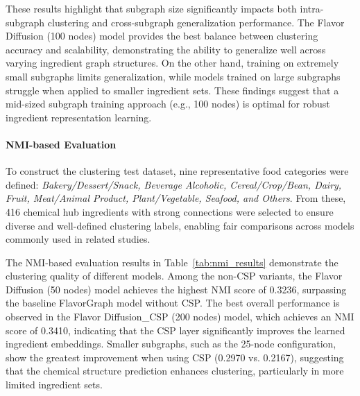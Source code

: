 \begin{table}[h!]
  \centering
  \caption{Generalization Performance: Validation MSE Loss}
  \label{tab:generalization_results}
\end{table}

These results highlight that subgraph size significantly impacts both intra-subgraph clustering and cross-subgraph generalization performance. The Flavor Diffusion (100 nodes) model provides the best balance between clustering accuracy and scalability, demonstrating the ability to generalize well across varying ingredient graph structures. On the other hand, training on extremely small subgraphs limits generalization, while models trained on large subgraphs struggle when applied to smaller ingredient sets. These findings suggest that a mid-sized subgraph training approach (e.g., 100 nodes) is optimal for robust ingredient representation learning.


\paragraph{NMI-based Evaluation}

To construct the clustering test dataset, nine representative food categories were defined: \textit{Bakery/Dessert/Snack, Beverage Alcoholic, Cereal/Crop/Bean, Dairy, Fruit, Meat/Animal Product, Plant/Vegetable, Seafood, and Others}. From these, 416 chemical hub ingredients with strong connections were selected to ensure diverse and well-defined clustering labels, enabling fair comparisons across models commonly used in related studies.


The NMI-based evaluation results in Table~\ref{tab:nmi_results} demonstrate the clustering quality of different models. Among the non-CSP variants, the Flavor Diffusion (50 nodes) model achieves the highest NMI score of 0.3236, surpassing the baseline FlavorGraph model without CSP. The best overall performance is observed in the Flavor Diffusion\_CSP (200 nodes) model, which achieves an NMI score of 0.3410, indicating that the CSP layer significantly improves the learned ingredient embeddings. Smaller subgraphs, such as the 25-node configuration, show the greatest improvement when using CSP (0.2970 vs. 0.2167), suggesting that the chemical structure prediction enhances clustering, particularly in more limited ingredient sets.

